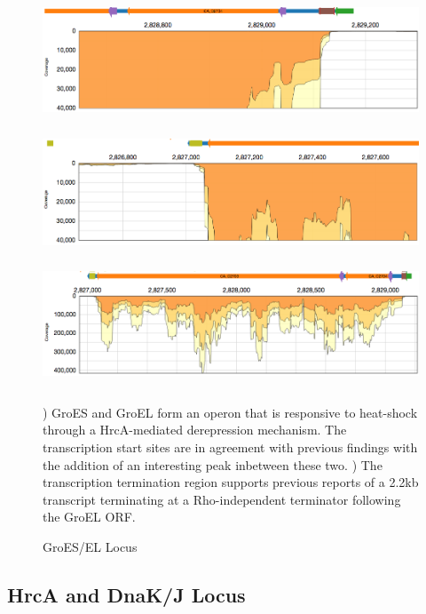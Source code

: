 \begin{figure}
\small
{\includegraphics[width=\textwidth,height=1.5in]{images/Assembly/Examples/GroESL/GroESL-TSS.png}
\label{fig:5.15a}}
{\includegraphics[width=\textwidth,height=1.5in]{images/Assembly/Examples/GroESL/GroESL-termination.png}
\label{fig:5.15b}}
{\includegraphics[width=\textwidth,height=1.5in]{images/Assembly/Examples/GroESL/GroESL-curated.png}
\label{fig:5.15c}}
\caption{GroES/EL Locus}
) GroES and GroEL form an operon that is responsive to heat-shock through a HrcA-mediated derepression mechanism. The transcription start sites are in agreement with previous findings with the addition of an interesting peak inbetween these two. ) The transcription termination region supports previous reports of a 2.2kb transcript terminating at a Rho-independent terminator following the GroEL ORF. 
\end{figure}


\subsection{HrcA and DnaK/J Locus}

